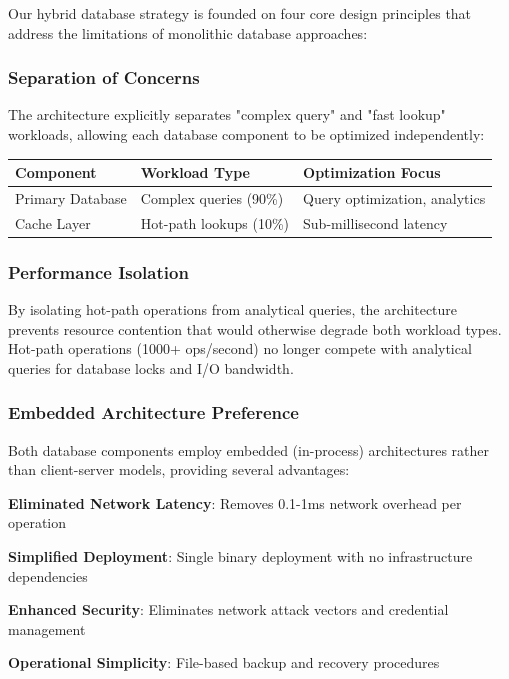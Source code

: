 Our hybrid database strategy is founded on four core design principles that address the limitations of monolithic database approaches:

\subsubsection*{Separation of Concerns}

The architecture explicitly separates "complex query" and "fast lookup" workloads, allowing each database component to be optimized independently:

\begin{center}
\begin{tabular}{@{}lll@{}}
\toprule
\textbf{Component} & \textbf{Workload Type} & \textbf{Optimization Focus} \\
\midrule
Primary Database & Complex queries (90\%) & Query optimization, analytics \\
Cache Layer & Hot-path lookups (10\%) & Sub-millisecond latency \\
\bottomrule
\end{tabular}
\end{center}

\subsubsection*{Performance Isolation}

By isolating hot-path operations from analytical queries, the architecture prevents resource contention that would otherwise degrade both workload types. Hot-path operations (1000+ ops/second) no longer compete with analytical queries for database locks and I/O bandwidth.

\subsubsection*{Embedded Architecture Preference}

Both database components employ embedded (in-process) architectures rather than client-server models, providing several advantages:

\begin{compactlist}
    \item \textbf{Eliminated Network Latency}: Removes 0.1-1ms network overhead per operation
    \item \textbf{Simplified Deployment}: Single binary deployment with no infrastructure dependencies
    \item \textbf{Enhanced Security}: Eliminates network attack vectors and credential management
    \item \textbf{Operational Simplicity}: File-based backup and recovery procedures
\end{compactlist}

